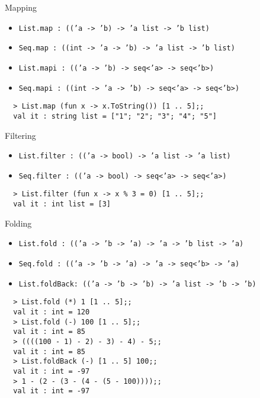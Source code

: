 \documentclass{beamer}
\begin{document}
\begin{frame}[fragile]{Mapping}
  \tiny
  \begin{itemize}
    \item \texttt{List.map : (('a -> 'b) -> 'a list -> 'b list)}
    \item \texttt{Seq.map : ((int -> 'a -> 'b) -> 'a list -> 'b list)}
    \item \texttt{List.mapi : (('a -> 'b) -> seq<'a> -> seq<'b>)}
    \item \texttt{Seq.mapi : ((int -> 'a -> 'b) -> seq<'a> -> seq<'b>)}
  \end{itemize}
  \begin{verbatim}
  > List.map (fun x -> x.ToString()) [1 .. 5];;
  val it : string list = ["1"; "2"; "3"; "4"; "5"]
  \end{verbatim}
\end{frame}

\begin{frame}[fragile]{Filtering}
  \tiny
  \begin{itemize}
    \item \texttt{List.filter : (('a -> bool) -> 'a list -> 'a list)}
    \item \texttt{Seq.filter : (('a -> bool) -> seq<'a> -> seq<'a>)}
  \end{itemize}
  \begin{verbatim}
  > List.filter (fun x -> x % 3 = 0) [1 .. 5];;
  val it : int list = [3]
  \end{verbatim}
\end{frame}

\begin{frame}[fragile]{Folding}
  \tiny
  \begin{itemize}
    \item \texttt{List.fold : (('a -> 'b -> 'a) -> 'a -> 'b list -> 'a)}
    \item \texttt{Seq.fold : (('a -> 'b -> 'a) -> 'a -> seq<'b> -> 'a)}
    \item \texttt{List.foldBack: (('a -> 'b -> 'b) -> 'a list -> 'b -> 'b)}
  \end{itemize}
  \begin{verbatim}
  > List.fold (*) 1 [1 .. 5];;
  val it : int = 120
  > List.fold (-) 100 [1 .. 5];;
  val it : int = 85
  > ((((100 - 1) - 2) - 3) - 4) - 5;;
  val it : int = 85
  > List.foldBack (-) [1 .. 5] 100;;
  val it : int = -97
  > 1 - (2 - (3 - (4 - (5 - 100))));;
  val it : int = -97
  \end{verbatim}
\end{frame}
\end{document}
